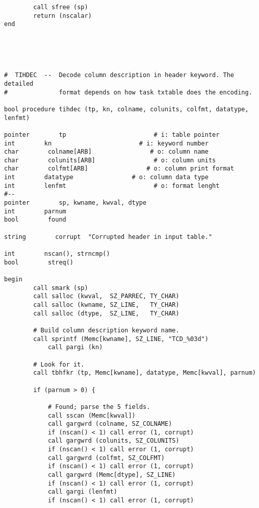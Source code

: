 \begin{verbatim}
        call sfree (sp)
        return (nscalar)
end





#  TIHDEC  --  Decode column description in header keyword. The detailed
#              format depends on how task txtable does the encoding.

bool procedure tihdec (tp, kn, colname, colunits, colfmt, datatype, lenfmt)

pointer        tp                        # i: table pointer
int        kn                        # i: keyword number
char        colname[ARB]                # o: column name
char        colunits[ARB]                # o: column units
char        colfmt[ARB]                # o: column print format
int        datatype                # o: column data type
int        lenfmt                        # o: format lenght
#--
pointer        sp, kwname, kwval, dtype
int        parnum
bool        found

string        corrupt  "Corrupted header in input table."

int        nscan(), strncmp()
bool        streq()

begin
        call smark (sp)
        call salloc (kwval,  SZ_PARREC, TY_CHAR)
        call salloc (kwname, SZ_LINE,   TY_CHAR)
        call salloc (dtype,  SZ_LINE,   TY_CHAR)

        # Build column description keyword name.
        call sprintf (Memc[kwname], SZ_LINE, "TCD_%03d")
            call pargi (kn)

        # Look for it.
        call tbhfkr (tp, Memc[kwname], datatype, Memc[kwval], parnum)

        if (parnum > 0) {

            # Found; parse the 5 fields.
            call sscan (Memc[kwval])
            call gargwrd (colname, SZ_COLNAME) 
            if (nscan() < 1) call error (1, corrupt)
            call gargwrd (colunits, SZ_COLUNITS)
            if (nscan() < 1) call error (1, corrupt)
            call gargwrd (colfmt, SZ_COLFMT)
            if (nscan() < 1) call error (1, corrupt)
            call gargwrd (Memc[dtype], SZ_LINE)
            if (nscan() < 1) call error (1, corrupt)
            call gargi (lenfmt)
            if (nscan() < 1) call error (1, corrupt)


\end{verbatim}
